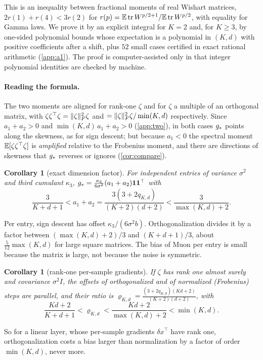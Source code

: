 \documentclass{article}
\theoremstyle{plain}
\newtheorem{corollary}[theorem]{Corollary}
\theoremstyle{definition}
\theoremstyle{remark}
\begin{document}
This is an inequality between fractional moments of real Wishart matrices,
$2r(1)+r(4)<3r(2)$ for $r(p)=\mathbb{E}\operatorname{tr} W^{p/2+1}/\mathbb{E}\operatorname{tr} W^{p/2}$, with equality for Gamma laws. We prove it by an explicit
integral for $K=2$ and, for $K\ge3$, by one-sided polynomial bounds whose expectation is a polynomial in $(K,d)$ with
positive coefficients after a shift, plus $52$ small cases certified in exact rational arithmetic (\cref{app:a1}).
The proof is computer-assisted only in that integer polynomial identities are checked by machine.

\paragraph{Reading the formula.} The two moments are aligned for rank-one $\zeta$ and for $\zeta$ a multiple of an
orthogonal matrix, with $\zeta\zeta^\top\zeta=\|\zeta\|_{F}^2\zeta$ and $=\|\zeta\|_{F}^2\zeta/\min(K,d)$ respectively. Since
$a_1+a_2>0$ and $\min(K,d)\,a_1+a_2>0$ (\cref{app:two}), in both cases $g_\ast$ points along the skewness, as for sign
descent; but because $a_1<0$ the spectral moment $\mathbb{E}[\zeta\zeta^\top\zeta]$ is \emph{amplified} relative to the Frobenius
moment, and there are directions of skewness that $g_\ast$ reverses or ignores (\cref{cor:compare}).

\begin{corollary}[exact dimension factor]\label{cor:dim}
For independent entries of variance $\sigma^2$ and third cumulant $\kappa_3$,
$g_\ast=\frac{\kappa_3}{6\sigma^2}(a_1+a_2)\mathbf{1}\mathbf{1}^\top$ with
\[
\frac3{K+d+1}<a_1+a_2=\frac{3(3+2q_{K,d})}{(K+2)(d+2)}<\frac3{\max(K,d)+2}.
\]
\end{corollary}
Per entry, sign descent has offset $\kappa_3/(6\sigma^2b)$. Orthogonalization divides it by a factor between
$(\max(K,d)+2)/3$ and $(K+d+1)/3$, about $\frac5{12}\max(K,d)$ for large square matrices. The bias of Muon per entry
is small because the matrix is large, not because the noise is symmetric.

\begin{corollary}[rank-one per-sample gradients]\label{cor:rank1}
If $\zeta$ has rank one almost surely and covariance $\sigma^2I$, the offsets of orthogonalized and of normalized
(Frobenius) steps are parallel, and their ratio is
$\varrho_{K,d}=\frac{(3+2q_{K,d})(Kd+2)}{(K+2)(d+2)}$, with
\[
\frac{Kd+2}{K+d+1}<\varrho_{K,d}<\frac{Kd+2}{\max(K,d)+2}<\min(K,d).
\]
\end{corollary}
So for a linear layer, whose per-sample gradients $\delta x^\top$ have rank one, orthogonalization costs a bias larger
than normalization by a factor of order $\min(K,d)$, never more.
\end{document}
